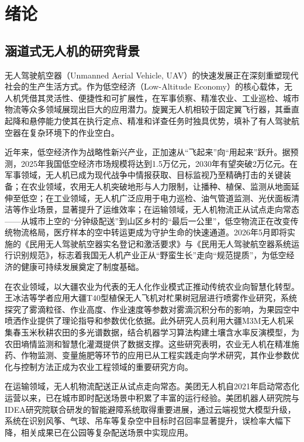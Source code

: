 
\chapter{绪论}

\section{涵道式无人机的研究背景}
无人驾驶航空器（Unmanned Aerial Vehicle, UAV）的快速发展正在深刻重塑现代社会的生产生活方式。作为低空经济（Low-Altitude Economy）的核心载体，无人机凭借其灵活性、便捷性和可扩展性，在军事侦察、精准农业、工业巡检、城市物流等众多领域展现出巨大的应用潜力。旋翼无人机相较于固定翼飞行器，其垂直起降和悬停能力使其在执行定点、精准和详查任务时独具优势，填补了有人驾驶航空器在复杂环境下的作业空白。

近年来，低空经济作为战略性新兴产业，正加速从“飞起来”向“用起来”跃升。据预测，2025年我国低空经济市场规模将达到1.5万亿元，2030年有望突破2万亿元。在军事领域，无人机已成为现代战争中情报获取、目标监视乃至精确打击的关键装备；在农业领域，农用无人机突破地形与人力限制\cite{liaoyong}，让播种、植保、监测从地面延伸至低空；在工业领域，无人机广泛应用于电力巡检、油气管道监测、光伏面板清洁等作业场景，显著提升了运维效率；在运输领域，无人机物流正从试点走向常态——从城市上空的“分钟级配送”到山区乡村的“最后一公里”，低空物流正在改变传统物流格局，医疗样本的空中转运更成为守护生命的快速通道。2026年5月即将实施的《民用无人驾驶航空器实名登记和激活要求》与《民用无人驾驶航空器系统运行识别规范》，标志着我国无人机产业正从“野蛮生长”走向“规范提质”，为低空经济的健康可持续发展奠定了制度基础。

在农业领域，以大疆农业为代表的无人化作业模式正推动传统农业向智慧化转型。王冰洁等学者应用大疆T40型植保无人飞机对杧果树冠层进行喷雾作业研究，系统探究了雾滴粒径、作业高度、作业速度等参数对雾滴沉积分布的影响，为果园空中喷洒作业提供了理论指导和参数优化依据\cite{wangbingjie}。此外研究人员利用大疆M3M无人机采集春玉米秋耕农田的多光谱数据，结合机器学习算法构建土壤含水率反演模型，为农田墒情监测和智慧化灌溉提供了数据支撑\cite{fanzikang}。这些研究表明，农业无人机在精准施药、作物监测、变量施肥等环节的应用已从工程实践走向学术研究，其作业参数优化与控制方法正成为农业工程领域的重要研究方向。

在运输领域，无人机物流配送正从试点走向常态。美团无人机自2021年启动常态化运营以来，已在城市即时配送场景中积累了丰富的运行经验。美团机器人研究院与IDEA研究院联合研发的智能避障系统取得重要进展，通过云端视觉大模型升级，系统在识别风筝、气球、吊车等复杂空中目标时召回率显著提升，误检率大幅下降，相关成果已在公园等复杂配送场景中实现应用。

